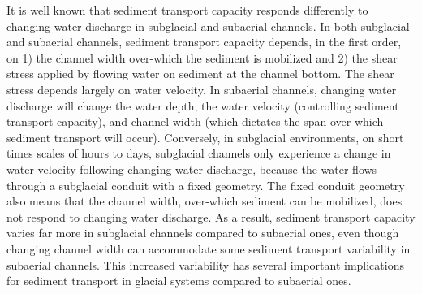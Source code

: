 \documentclass[11pt]{article}
\begin{document}
\vspace{0.5cm}

\laysummary %
It is well known that sediment transport capacity responds differently to changing water discharge in subglacial and subaerial channels.
In both subglacial and subaerial channels, sediment transport capacity depends, in the first order, on 1) the channel width over-which the sediment is mobilized  and 2) the shear stress applied by flowing water on sediment at the channel bottom.
The shear stress depends largely on water velocity.
In subaerial channels, changing water discharge will change the water depth, the water velocity (controlling sediment transport capacity),  and channel width (which dictates the span over which sediment transport  will occur).
Conversely, in subglacial environments, on short times scales of hours to days, subglacial channels only experience a change in water velocity following changing water discharge, because the water flows through a subglacial conduit with a fixed geometry.
The fixed conduit geometry also means that the channel width, over-which sediment can be mobilized, does not respond to changing water discharge.
As a result, sediment transport capacity varies far more in subglacial channels compared to subaerial ones, even though changing channel width can accommodate some sediment transport variability in subaerial channels.
This increased variability has several important implications for sediment transport in glacial systems compared to subaerial ones.
\end{document}

